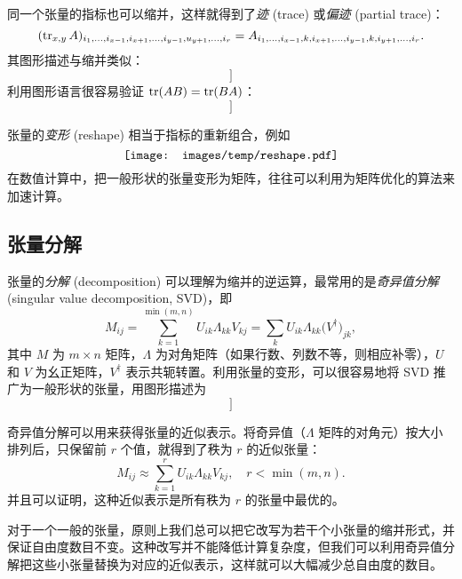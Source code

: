 同一个张量的指标也可以缩并，这样就得到了\emph{迹} (trace) 或\emph{偏迹} (partial trace)：
\begin{equation}
    (\operatorname{tr}_{x,y} A)_{i_1,\dots,i_{x-1},i_{x+1},\dots,i_{y-1},u_{y+1},\dots,i_r}
  = A_{i_1,\dots,i_{x-1},k,i_{x+1},\dots,i_{y-1},k,i_{y+1},\dots,i_r}.
\end{equation}
其图形描述与缩并类似：
\begin{equation}
  [[TODO:]]
\end{equation}
利用图形语言很容易验证 $\operatorname{tr}(AB)=\operatorname{tr}(BA)$：
\begin{equation}
  [[TODO:]]
\end{equation}

张量的\emph{变形} (reshape) 相当于指标的重新组合，例如
\begin{equation}
  \mbox{\texttt{[image: images/temp/reshape.pdf]}}
\end{equation}
在数值计算中，把一般形状的张量变形为矩阵，往往可以利用为矩阵优化的算法来加速计算。

\subsection{张量分解}

张量的\emph{分解} (decomposition) 可以理解为缩并的逆运算，最常用的是\emph{奇异值分解} (singular value decomposition, SVD)，即
\begin{equation}
  M_{ij} = \sum_{k=1}^{\min(m,n)} U_{ik} \Lambda_{kk} V_{kj} = \sum_k U_{ik} \Lambda_{kk} \bigl( V^\dagger \bigr)_{jk},
\end{equation}
其中 $M$ 为 $m\times n$ 矩阵，$\Lambda$ 为对角矩阵（如果行数、列数不等，则相应补零），$U$ 和 $V$ 为幺正矩阵，$V^\dagger$ 表示共轭转置。利用张量的变形，可以很容易地将 SVD 推广为一般形状的张量，用图形描述为
\begin{equation}
  [[TODO:]]
\end{equation}

奇异值分解可以用来获得张量的近似表示。将奇异值（$\Lambda$ 矩阵的对角元）按大小排列后，只保留前 $r$ 个值，就得到了秩为 $r$ 的近似张量：
\begin{equation}
  M_{ij} \approx \sum_{k=1}^r U_{ik} \Lambda_{kk} V_{kj}, \quad r < \min(m,n).
\end{equation}
并且可以证明，这种近似表示是所有秩为 $r$ 的张量中最优的。

对于一个一般的张量，原则上我们总可以把它改写为若干个小张量的缩并形式，并保证自由度数目不变。这种改写并不能降低计算复杂度，但我们可以利用奇异值分解把这些小张量替换为对应的近似表示，这样就可以大幅减少总自由度的数目。

